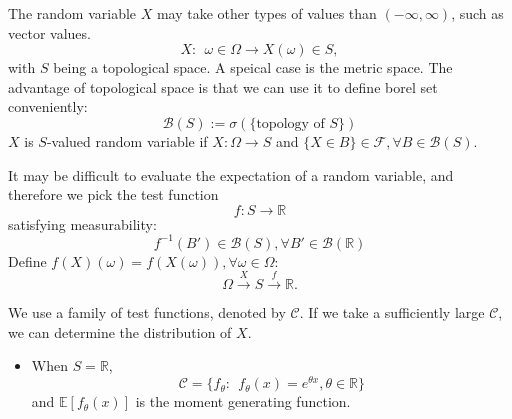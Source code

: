 The random variable $X$ may take other types of values than $(-\infty,\infty)$, such as vector values.
\[
X:~~\omega\in\Omega\to X(\omega)\in S,
\]
with $S$ being a topological space.
A speical case is the metric space.
The advantage of topological space is that we can use it to define borel set conveniently:
\[
\mathcal{B}(S):=\sigma(\{\mbox{topology of $S$}\})
\]
$X$ is $S$-valued random variable if $X:\Omega\to S$ and $\{X\in B\}\in\mathcal{F}, \forall B\in\mathcal{B}(S)$.

It may be difficult to evaluate the expectation of a random variable, and therefore we pick the test function
\[
f: S\to\mathbb{R}
\]
satisfying measurability:
\[
f^{-1}(B')\in\mathcal{B}(S), \forall B'\in\mathcal{B}(\mathbb{R})
\]
Define $f(X)(\omega) = f(X(\omega)), \forall \omega\in\Omega$:
\[
\Omega\xrightarrow{X} S\xrightarrow{f}\mathbb{R}.
\]

We use a family of test functions, denoted by $\mathcal{C}$.
If we take a sufficiently large $\mathcal{C}$, we can determine the distribution of $X$.
\begin{itemize}
\item
When $S=\mathbb{R}$,
\[
\mathcal{C} = \{f_{\theta}:~~f_{\theta}(x) = e^{\theta x}, \theta\in\mathbb{R}\}
\]
and $\mathbb{E}[f_{\theta}(x)]$ is the moment generating function.

\end{itemize}







